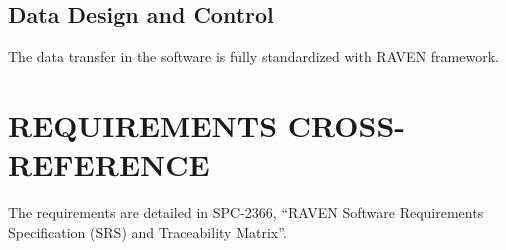 \subsection{Data Design and Control}
The data transfer in the  software is fully standardized with RAVEN framework.
 \section{REQUIREMENTS CROSS-REFERENCE} 
The requirements are detailed in SPC-2366, ``RAVEN Software Requirements Specification (SRS) and Traceability Matrix''.
